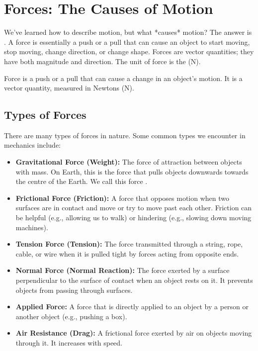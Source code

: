 \section{Forces: The Causes of Motion}

We've learned how to describe motion, but what *causes* motion?  The answer is .  A force is essentially a push or a pull that can cause an object to start moving, stop moving, change direction, or change shape. Forces are vector quantities; they have both magnitude and direction.  The unit of force is the  (N).

\begin{keyconcept}{Force}
 is a push or a pull that can cause a change in an object's motion. It is a vector quantity, measured in Newtons (N).
\end{keyconcept}

\subsection{Types of Forces}

There are many types of forces in nature.  Some common types we encounter in mechanics include:

\begin{itemize}
    \item \textbf{Gravitational Force (Weight):} The force of attraction between objects with mass. On Earth, this is the force that pulls objects downwards towards the centre of the Earth. We call this force .
    \item \textbf{Frictional Force (Friction):} A force that opposes motion when two surfaces are in contact and move or try to move past each other. Friction can be helpful (e.g., allowing us to walk) or hindering (e.g., slowing down moving machines).
    \item \textbf{Tension Force (Tension):} The force transmitted through a string, rope, cable, or wire when it is pulled tight by forces acting from opposite ends.
    \item \textbf{Normal Force (Normal Reaction):} The force exerted by a surface perpendicular to the surface of contact when an object rests on it. It prevents objects from passing through surfaces.
    \item \textbf{Applied Force:} A force that is directly applied to an object by a person or another object (e.g., pushing a box).
    \item \textbf{Air Resistance (Drag):} A frictional force exerted by air on objects moving through it.  It increases with speed.
\end{itemize}

